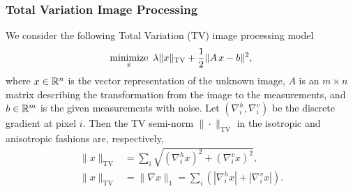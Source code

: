 \subsubsection{Total Variation Image Processing}
We consider the following Total Variation (TV) image processing model
\begin{equation}\label{eqn:tvl2}
\Min_{x}~\lambda \|x\|_{\text{TV}} + \frac{1}{2} \|A\,x - b\|^2,
\end{equation}
where $x\in \mathbb{R}^n$ is the vector representation of the unknown image, $A$ is an $m \times n$ matrix describing the transformation from the image to the measurements, and $b \in \mathbb{R}^m$ is the given measurements with noise. Let $(\nabla_i^h,\nabla_i^v)$ be the discrete gradient at pixel $i$. Then the TV semi-norm $\|\cdot\|_{\text{TV}}$ in the isotropic and anisotropic fashions are, respectively,
\begin{subequations}
\begin{align}
\|x\|_{\text{TV}} &= {\sum_{i} \sqrt{(\nabla_i^h x)^2 + (\nabla_i^v x)^2},}\\
  \| x\|_{\text{TV}} &= \| \nabla x\|_1 = \sum_{i} \left(|\nabla_i^h x| + |\nabla_i^v x|\right).
	\end{align}
\end{subequations}

